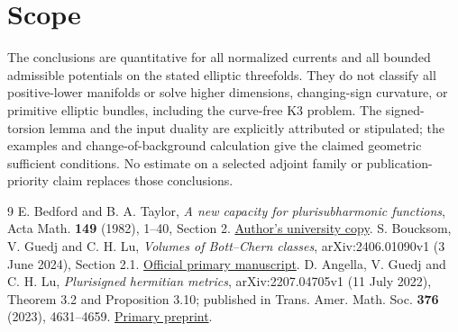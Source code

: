 \documentclass[11pt]{article}
\begin{document}
\section{Scope}

The conclusions are quantitative for all normalized currents and all
bounded admissible potentials on the stated elliptic threefolds.
They do not classify all positive-lower manifolds or solve higher
dimensions, changing-sign curvature, or primitive elliptic bundles,
including the curve-free K3 problem. The signed-torsion lemma and the
input duality are explicitly attributed or stipulated; the examples
and change-of-background calculation give the claimed geometric
sufficient conditions. No estimate on a selected adjoint family or
publication-priority claim replaces those conclusions.

\begin{thebibliography}{9}
E. Bedford and B. A. Taylor, \emph{A new capacity for plurisubharmonic
functions}, Acta Math. \textbf{149} (1982), 1--40, Section 2.
\href{https://www.math.stonybrook.edu/~ebedford/PapersForM655/BTNewCapacity.pdf}
{Author's university copy}.
S. Boucksom, V. Guedj and C. H. Lu, \emph{Volumes of Bott--Chern classes},
arXiv:2406.01090v1 (3 June 2024), Section 2.1.
\href{https://arxiv.org/abs/2406.01090v1}{Official primary manuscript}.
D. Angella, V. Guedj and C. H. Lu, \emph{Plurisigned hermitian metrics},
arXiv:2207.04705v1 (11 July 2022), Theorem 3.2 and Proposition 3.10;
published in Trans. Amer. Math. Soc. \textbf{376} (2023), 4631--4659.
\href{https://arxiv.org/abs/2207.04705v1}{Primary preprint}.
\end{thebibliography}
\end{document}
